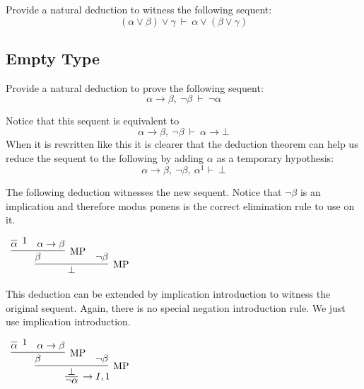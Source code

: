 \documentclass{book}
\begin{document}
    \begin{eg}

        Provide a natural deduction to witness the following sequent: $$(\alpha \lor \beta) \lor \gamma \ \vdash \ \alpha \lor (\beta \lor \gamma) $$

    \end{eg}
    
    \newpage
    \subsection*{Empty Type}

    \begin{eg}
        Provide a natural deduction to prove the following sequent: $$\alpha \to \beta, \ \lnot \beta \ \vdash \ \lnot \alpha$$

        Notice that this sequent is equivalent to $$\alpha \to \beta, \ \lnot \beta \ \vdash \ \alpha \to \bot$$ When it is rewritten like this it is clearer that the deduction theorem can help us reduce the sequent to the following by adding $\alpha$ as a temporary hypothesis: $$\alpha \to \beta, \ \lnot \beta, \ \alpha^{1} \vdash \ \bot$$

        The following deduction witnesses the new sequent. Notice that $\lnot \beta$ is an implication and therefore modus ponens is the correct elimination rule to use on it. 

        \begin{center}
            $\begin{array}{c}
                \infer[\MP]{\bot}
                        {\infer[\MP]{\beta}
                            {\infer[1]{\alpha}
                                {}
                            &
                            \alpha \to \beta}
                        &
                        \lnot \beta}
            \end{array}$
        \end{center}  

        This deduction can be extended by implication introduction to witness the original sequent. Again, there is no special negation introduction rule. We just use implication introduction.

        \begin{center}
            $\begin{array}{c}
                \infer[\to I,1]{\lnot \alpha}
                    {\infer[\MP]{\bot}
                        {\infer[\MP]{\beta}
                            {\infer[1]{\alpha}
                                {}
                            &
                            \alpha \to \beta}
                        &
                        \lnot \beta}}
            \end{array}$
        \end{center}        
    \end{eg}
\end{document}
